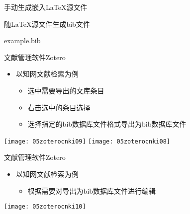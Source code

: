 \documentclass[fontset = none, t]{ctexbeamer}
\begin{document}
\begin{frame}[fragile]{手动生成}{嵌入\LaTeX 源文件}
\begin{spacing}{1.3}
\begin{center}
\begin{minipage}[h]{0.55\linewidth}
\begin{textcb}{随\LaTeX 源文件生成bib文件}
\begin{filecontents}{example.bib}
\begin{frame}[fragile]{文献管理软件}{Zotero}
  \begin{spacing}{1.2}
    \begin{itemize}
    \item 以\alert{知网}文献检索为例
      \begin{itemize}
      \item 选中需要导出的文库条目
      \item 右击选中的条目选择
      \item 选择指定的bib数据库文件格式导出为bib数据库文件
      \end{itemize}
    \end{itemize}    
    \begin{center}
      \texttt{[image: 05zoterocnki09]}\quad
      \texttt{[image: 05zoterocnki08]}
    \end{center}
  \end{spacing}
\end{frame}

\begin{frame}[fragile]{文献管理软件}{Zotero}
  \begin{spacing}{1.2}
    \begin{itemize}
    \item 以\alert{知网}文献检索为例
      \begin{itemize}
      \item 根据需要对导出为bib数据库文件进行编辑
      \end{itemize}
    \end{itemize}    
    \begin{center}
      \texttt{[image: 05zoterocnki10]}
    \end{center}
  \end{spacing}
\end{frame}

\end{filecontents}
\end{textcb}
\end{minipage}
\end{center}
\end{spacing}
\end{frame}
\end{document}
